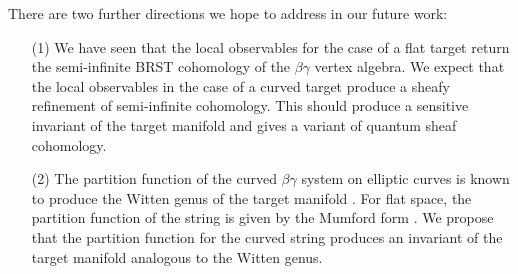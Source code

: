 There are two further directions we hope to address in our future work:
\begin{itemize}
\item[(1)] We have seen that the local observables for the case of a flat target return the semi-infinite BRST cohomology of the $\beta\gamma$ vertex algebra. 
We expect that the local observables in the case of a curved target produce a sheafy refinement of semi-infinite cohomology. 
This should produce a sensitive invariant of the target manifold and gives a variant of quantum sheaf cohomology. 
\item[(2)] The partition function of the curved $\beta\gamma$ system on elliptic curves is known to produce the Witten genus of the target manifold \cite{wg2}. 
For flat space, the partition function of the string is given by the Mumford form \cite{BM}. 
We propose that the partition function for the curved string produces an invariant of the target manifold analogous to the Witten genus. 
\end{itemize}
